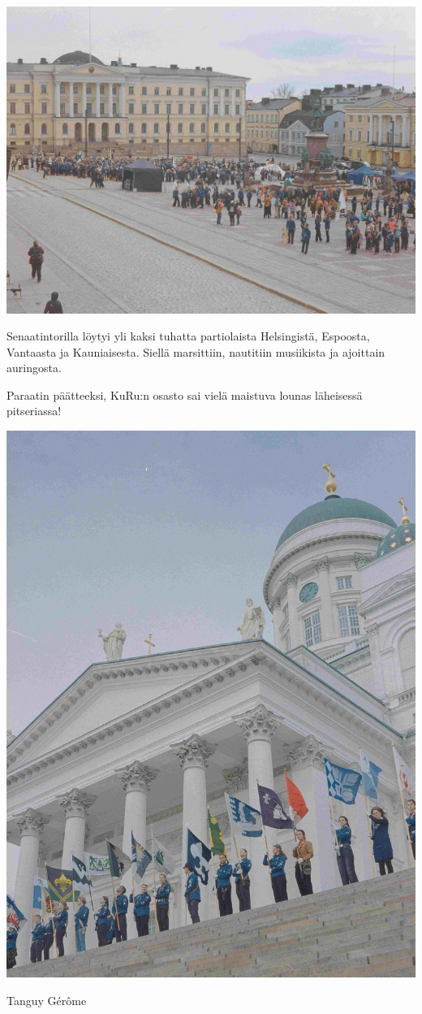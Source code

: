 \begin{multicols}{2}

	\begin{center}
		\noindent\includegraphics[width=0.85\linewidth]{assets/paraati4}
	\end{center}

	\vspace*{-0.16cm}
	\small Senaatintorilla löytyi yli kaksi tuhatta partiolaista Helsingistä, Espoosta, Vantaasta ja Kauniaisesta. Siellä marsittiin, nautitiin musiikista ja ajoittain auringosta.

	Paraatin päätteeksi, KuRu:n osasto sai vielä maistuva lounas läheisessä \mbox{pitseriassa}!

	\columnbreak

	\begin{center}
		\noindent\includegraphics[width=0.85\linewidth]{assets/paraati3}
	\end{center}


\end{multicols}


\medskip
\noindent\null\hfill Tanguy Gérôme
